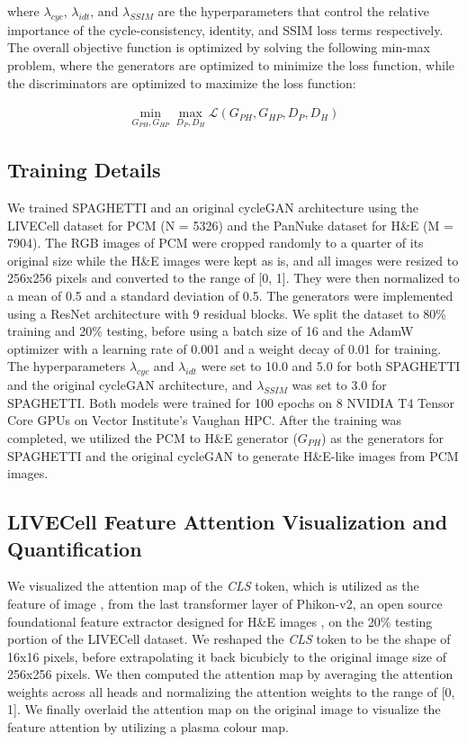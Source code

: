 \begin{refsegment}
where $\lambda_{cyc}$, $\lambda_{idt}$, and $\lambda_{SSIM}$ are the hyperparameters that control the relative importance of the cycle-consistency, identity, and SSIM loss terms respectively. The overall objective function is optimized by solving the following min-max problem, where the generators are optimized to minimize the loss function, while the discriminators are optimized to maximize the loss function:

\begin{equation}
  \begin{aligned}
    \min_{G_{PH}, G_{HP}} \max_{D_{P}, D_{H}} \mathcal{L}(G_{PH}, G_{HP}, D_{P}, D_{H})
  \end{aligned}
\end{equation}

\subsection*{Training Details}
We trained SPAGHETTI and an original cycleGAN architecture using the LIVECell dataset \autocite{LIVECell} for PCM (N = 5326) and the PanNuke dataset \autocite{pannuke} for H\&E (M = 7904). The RGB images of PCM were cropped randomly to a quarter of its original size while the H\&E images were kept as is, and all images were resized to 256x256 pixels and converted to the range of [0, 1]. They were then normalized to a mean of 0.5 and a standard deviation of 0.5. The generators were implemented using a ResNet architecture \autocite{resnet} with 9 residual blocks. We split the dataset to 80\% training and 20\% testing, before using a batch size of 16 and the AdamW optimizer \autocite{adamw} with a learning rate of 0.001 and a weight decay of 0.01 for training. The hyperparameters $\lambda_{cyc}$ and $\lambda_{idt}$ were set to 10.0 and 5.0 for both SPAGHETTI and the original cycleGAN architecture, and $\lambda_{SSIM}$ was set to 3.0 for SPAGHETTI. Both models were trained for 100 epochs on 8 NVIDIA T4 Tensor Core GPUs on Vector Institute's Vaughan HPC. After the training was completed, we utilized the PCM to H\&E generator ($G_{PH}$) as the generators for SPAGHETTI and the original cycleGAN to generate H\&E-like images from PCM images. 

\subsection*{LIVECell Feature Attention Visualization and Quantification}
We visualized the attention map of the \textit{CLS} token, which is utilized as the feature of image \autocite{vit}, from the last transformer layer of Phikon-v2, an open source foundational feature extractor designed for H\&E images \autocite{phikonv2}, on the 20\% testing portion of the LIVECell dataset. We reshaped the \textit{CLS} token to be the shape of 16x16 pixels, before extrapolating it back bicubicly to the original image size of 256x256 pixels. We then computed the attention map by averaging the attention weights across all heads and normalizing the attention weights to the range of [0, 1]. We finally overlaid the attention map on the original image to visualize the feature attention by utilizing a plasma colour map. 


\end{refsegment}
